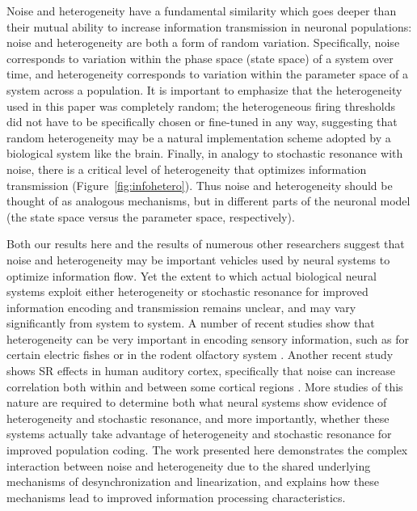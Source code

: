 \documentclass[12pt]{article}
\begin{document}
Noise and heterogeneity have a fundamental similarity which goes deeper than their mutual ability to increase information transmission in neuronal populations: noise and heterogeneity are both a form of random variation. Specifically, noise corresponds to variation within the phase space (state space) of a system over time, and heterogeneity corresponds to variation within the parameter space of a system across a population. It is important to emphasize that the heterogeneity used in this paper was completely random; the heterogeneous firing thresholds did not have to be specifically chosen or fine-tuned in any way, suggesting that random heterogeneity may be a natural implementation scheme adopted by a biological system like the brain. Finally, in analogy to stochastic resonance with noise, there is a critical level of heterogeneity that optimizes information transmission (Figure~\ref{fig:infohetero}). Thus noise and heterogeneity should be thought of as analogous mechanisms, but in different parts of the neuronal model (the state space versus the parameter space, respectively).

Both our results here and the results of numerous other researchers suggest that noise and heterogeneity may be important vehicles used by neural systems to optimize information flow. Yet the extent to which actual biological neural systems exploit either heterogeneity or stochastic resonance for improved information encoding and transmission remains unclear, and may vary significantly from system to system. A number of recent studies show that heterogeneity can be very important in encoding sensory information, such as for certain electric fishes \citep{Marsat2010} or in the rodent olfactory system \citep{Padmanabhan2010,Burton2012}. Another recent study shows SR effects in human auditory cortex, specifically that noise can increase correlation both within and between some cortical regions \citep{Ward2010}. More studies of this nature are required to determine both what neural systems show evidence of heterogeneity and stochastic resonance, and more importantly, whether these systems actually take advantage of heterogeneity and stochastic resonance for improved population coding. The work presented here demonstrates the complex interaction between noise and heterogeneity due to the shared underlying mechanisms of desynchronization and linearization, and explains how these mechanisms lead to improved information processing characteristics.


\end{document}
